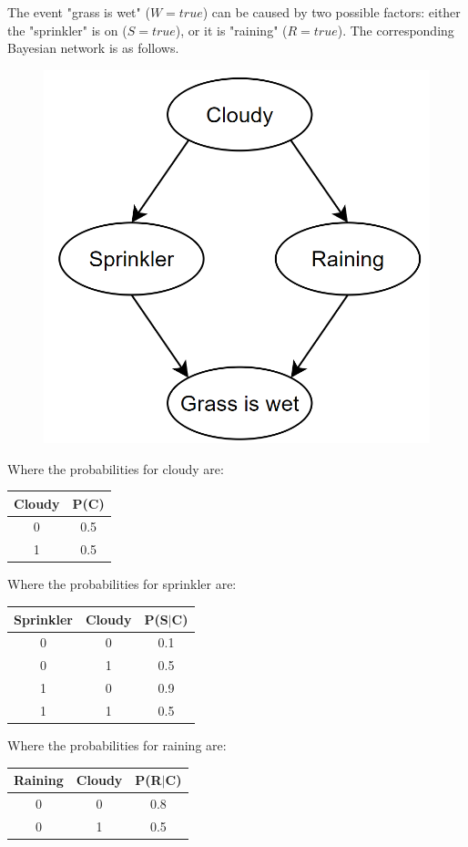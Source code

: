 \begin{example}
    The event "grass is wet" ($W=true$) can be caused by two possible factors: either the "sprinkler" is on ($S=true$), or it is "raining" ($R=true$). 
    The corresponding Bayesian network is as follows.
    \begin{figure}[H]
        \centering
        \includegraphics[width=0.25\linewidth]{images/sprinkler.png}
    \end{figure}
    Where the probabilities for cloudy are: 
    \begin{table}[H]
        \centering
        \begin{tabular}{cc}
        \hline
        \textbf{Cloudy} & \textbf{P(C)} \\ \hline
        0      & 0.5  \\
        1      & 0.5  \\ \hline
        \end{tabular}
    \end{table}
    Where the probabilities for sprinkler are: 
    \begin{table}[H]
        \centering
        \begin{tabular}{ccc}
        \hline
        \textbf{Sprinkler} & \textbf{Cloudy} & \textbf{P(S$|$C)} \\ \hline
        0         & 0      & 0.1  \\
        0         & 1      & 0.5  \\
        1         & 0      & 0.9  \\
        1         & 1      & 0.5  \\ \hline
        \end{tabular}
    \end{table}
    Where the probabilities for raining are: 
    \begin{table}[H]
        \centering
        \begin{tabular}{ccc}
        \hline
        \textbf{Raining} & \textbf{Cloudy} & \textbf{P(R$|$C)} \\ \hline
        0       & 0      & 0.8    \\
        0       & 1      & 0.5    \\

\end{tabular}
\end{table}
\end{example}
